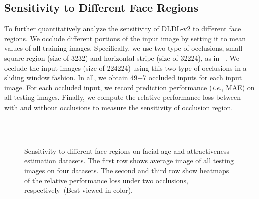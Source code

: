 \documentclass[5p,times,twocolumn]{elsarticle}
\makeatletter
\DeclareRobustCommand\onedot{\@onedot}
\def\@onedot{.}
\def\ie{\emph{i.e}\onedot}
\makeatother
\begin{document}
\subsection{Sensitivity to Different Face Regions}
To further quantitatively analyze the sensitivity of DLDL-v2 to different face regions. We occlude different portions of the input image by setting it to mean values of all training images. Specifically, we use two type of occlusions, small square region (size of 3232) and horizontal stripe (size of 32224), as in ~\cite{zeiler2014visualizing, rothe2016deep}. We occlude the input images (size of 224224) using this two type of occlusions in a sliding window fashion. In all, we obtain 49+7 occluded inputs for each input image. For each occluded input, we record prediction performance (\ie, MAE) on all testing images. Finally, we compute the relative performance loss between with and without occlusions to measure the sensitivity of occlusion region.

\begin{figure}
    \captionsetup[subfigure]{labelformat=empty}
    \captionsetup[subfigure]{justification=centering}
    \centering
    \\ \vspace{-22pt}
    \\ \vspace{-22pt}
 \caption{Sensitivity to different face regions on facial age and attractiveness estimation datasets. The first row shows average image of all testing images on four datasets. The second and third row show heatmaps of the relative performance loss under two occlusions, respectively~(Best viewed in color).}\label{fig:occvi}  
 \vspace{-15pt}
\end{figure}
\end{document}
